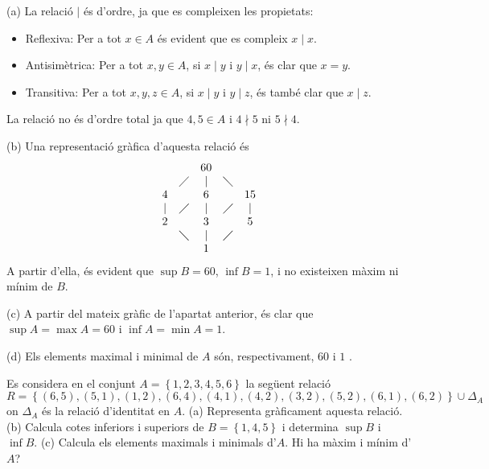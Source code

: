 \begin{solucio}
(a) La relació $\mid $ és d'ordre, ja que es compleixen les
propietats:

\begin{itemize}
\item Reflexiva: Per a tot $x\in A$ és evident que es compleix $x\mid x$.

\item Antisimètrica: Per a tot $x,y\in A$, si $x\mid y$ i $y\mid x$,
és clar que $x=y$.

\item Transitiva: Per a tot $x,y,z\in A$, si $x\mid y$ i $y\mid z$, és
també clar que $x\mid z$.
\end{itemize}

La relació no és d'ordre total ja que $4,5\in A$ i $4\nmid 5$ ni $%
5\nmid 4$.

(b) Una representació gràfica d'aquesta relació és%
\begin{equation*}
\begin{array}{ccccc}
&  & 60 &  &  \\
& \diagup & | & \diagdown &  \\
4 &  & 6 &  & 15 \\
| & \diagup & | & \diagup & | \\
2 &  & 3 &  & 5 \\
& \diagdown & | & \diagup &  \\
&  & 1 &  &
\end{array}%
\end{equation*}%
A partir d'ella, és evident que $\sup B=60$, $\inf B=1$, i no existeixen
màxim ni mínim de $B$.

(c) A partir del mateix gràfic de l'apartat anterior, és clar que $%
\sup A=\max A=60$ i $\inf A=\min A=1$.

(d) Els elements maximal i minimal de $A$ són, respectivament, $60$ i $1$%
.
\end{solucio}

\begin{exercici}
Es considera en el conjunt $A=\left\{ 1,2,3,4,5,6\right\} $ la següent
relació
\begin{equation*}
R=\left\{
(6,5),(5,1),(1,2),(6,4),(4,1),(4,2),(3,2),(5,2),(6,1),(6,2)\right\} \cup
\Delta _{A}
\end{equation*}%
on $\Delta _{A}$ és la relació d'identitat en $A$. (a) Representa gràficament aquesta relació. (b) Calcula cotes inferiors i superiors
de $B=\left\{ 1,4,5\right\} $ i determina $\sup B$ i $\inf B$. (c) Calcula
els elements maximals i minimals d'$A$. Hi ha màxim i mínim d'$A$?
\end{exercici}

